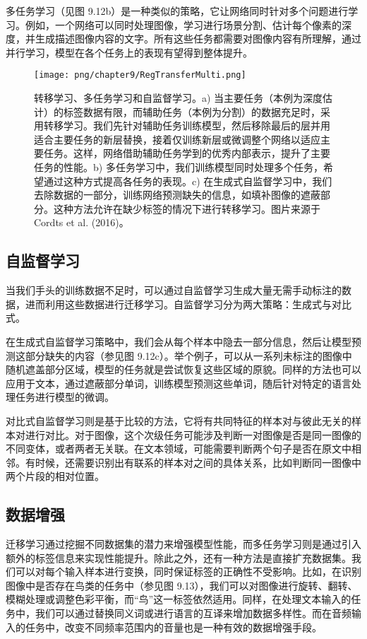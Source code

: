 多任务学习（见图 9.12b）是一种类似的策略，它让网络同时针对多个问题进行学习。例如，一个网络可以同时处理图像，学习进行场景分割、估计每个像素的深度，并生成描述图像内容的文字。所有这些任务都需要对图像内容有所理解，通过并行学习，模型在各个任务上的表现有望得到整体提升。

\begin{figure}[ht!]
	\centering
	\texttt{[image: png/chapter9/RegTransferMulti.png]}
	\caption{转移学习、多任务学习和自监督学习。a) 当主要任务（本例为深度估计）的标签数据有限，而辅助任务（本例为分割）的数据充足时，采用转移学习。我们先针对辅助任务训练模型，然后移除最后的层并用适合主要任务的新层替换，接着仅训练新层或微调整个网络以适应主要任务。这样，网络借助辅助任务学到的优秀内部表示，提升了主要任务的性能。b) 多任务学习中，我们训练模型同时处理多个任务，希望通过这种方式提高各任务的表现。c) 在生成式自监督学习中，我们去除数据的一部分，训练网络预测缺失的信息，如填补图像的遮蔽部分。这种方法允许在缺少标签的情况下进行转移学习。图片来源于 Cordts et al. (2016)。}
\end{figure}

\subsection{自监督学习}
当我们手头的训练数据不足时，可以通过自监督学习生成大量无需手动标注的数据，进而利用这些数据进行迁移学习。自监督学习分为两大策略：生成式与对比式。

在生成式自监督学习策略中，我们会从每个样本中隐去一部分信息，然后让模型预测这部分缺失的内容（参见图 9.12c）。举个例子，可以从一系列未标注的图像中随机遮盖部分区域，模型的任务就是尝试恢复这些区域的原貌。同样的方法也可以应用于文本，通过遮蔽部分单词，训练模型预测这些单词，随后针对特定的语言处理任务进行模型的微调。

对比式自监督学习则是基于比较的方法，它将有共同特征的样本对与彼此无关的样本对进行对比。对于图像，这个次级任务可能涉及判断一对图像是否是同一图像的不同变体，或者两者无关联。在文本领域，可能需要判断两个句子是否在原文中相邻。有时候，还需要识别出有联系的样本对之间的具体关系，比如判断同一图像中两个片段的相对位置。
\subsection{数据增强}
迁移学习通过挖掘不同数据集的潜力来增强模型性能，而多任务学习则是通过引入额外的标签信息来实现性能提升。除此之外，还有一种方法是直接扩充数据集。我们可以对每个输入样本进行变换，同时保证标签的正确性不受影响。比如，在识别图像中是否存在鸟类的任务中（参见图 9.13），我们可以对图像进行旋转、翻转、模糊处理或调整色彩平衡，而“鸟”这一标签依然适用。同样，在处理文本输入的任务中，我们可以通过替换同义词或进行语言的互译来增加数据多样性。而在音频输入的任务中，改变不同频率范围内的音量也是一种有效的数据增强手段。


